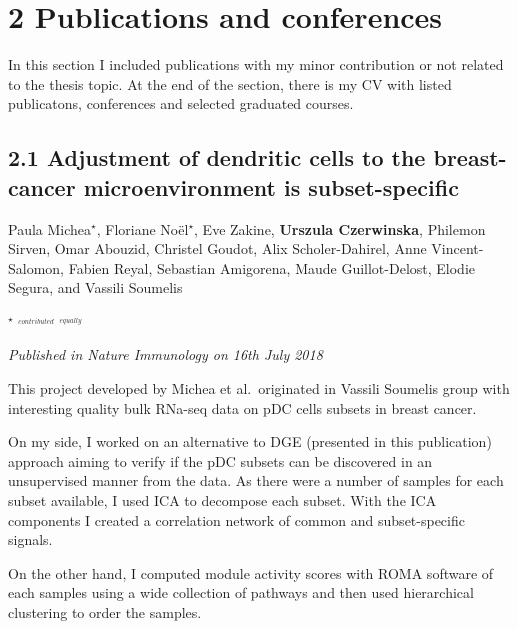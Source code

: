 \documentclass[12pt,]{book}
\theoremstyle{definition}
\theoremstyle{definition}
\theoremstyle{definition}
\theoremstyle{remark}
\begin{document}


\newpage

\hypertarget{publications-and-conferences}{%
\section*{2 Publications and
conferences}\label{publications-and-conferences}}

In this section I included publications with my minor contribution or
not related to the thesis topic. At the end of the section, there is my
CV with listed publicatons, conferences and selected graduated courses.

\hypertarget{adjustment-of-dendritic-cells-to-the-breast-cancer-microenvironment-is-subset-specific}{%
\subsection*{2.1 Adjustment of dendritic cells to the breast-cancer
microenvironment is
subset-specific}\label{adjustment-of-dendritic-cells-to-the-breast-cancer-microenvironment-is-subset-specific}}

Paula Michea\(^\star\), Floriane Noël\(^\star\), Eve Zakine,
\textbf{Urszula Czerwinska}, Philemon Sirven, Omar Abouzid, Christel
Goudot, Alix Scholer-Dahirel, Anne Vincent-Salomon, Fabien Reyal,
Sebastian Amigorena, Maude Guillot-Delost, Elodie Segura, and Vassili
Soumelis

\(^\star\) \(^{_{contributed}}\) \(^{_{equally}}\)

\emph{Published in Nature Immunology on 16th July 2018}

This project developed by Michea et al.~originated in Vassili Soumelis
group with interesting quality bulk RNa-seq data on pDC cells subsets in
breast cancer.

On my side, I worked on an alternative to DGE (presented in this
publication) approach aiming to verify if the pDC subsets can be
discovered in an unsupervised manner from the data. As there were a
number of samples for each subset available, I used ICA to decompose
each subset. With the ICA components I created a correlation network of
common and subset-specific signals.

On the other hand, I computed module activity scores with ROMA software
\citep{Maginetti2017} of each samples using a wide collection of
pathways and then used hierarchical clustering to order the samples.
\end{document}
